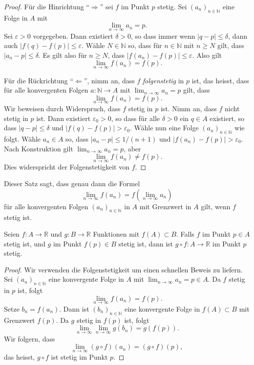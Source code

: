 \documentclass[../main.tex]{subfiles}
\begin{document}
\begin{proof}
  Für die Hinrichtung ``$\Rightarrow$'' sei $f$
  im Punkt $p$ stetig. Sei ${(a_{n})}_{n \in \mathbb{N}}$ 
  eine Folge in $A$ mit
  \[
    \lim_{n \to \infty} a_n = p.
  \]
  Sei $\varepsilon > 0$ vorgegeben.
  Dann existiert $\delta > 0$, so dass immer wenn
  $|q - p| \leq \delta$, dann auch
  $|f(q) - f(p)| \leq \varepsilon$.
  Wähle $N \in \mathbb{N}$ so,
  dass für $n \in \mathbb{N}$ mit $n \geq N$ gilt,
  dass $|a_n - p| \leq \delta$.
  Es gilt also für $n \geq N$, dass
  $|f(a_n) - f(p)| \leq \varepsilon$.
  Also gilt
  \[
    \lim_{n \to \infty} f(a_n) = f(p).
  \]
  
  Für die Rückrichtung ``$\Leftarrow$'', nimm an,
  dass $f$ \emph{folgenstetig} in $p$ ist,
  das heisst, dass für alle
  konvergenten Folgen $a \colon \mathbb{N} \to A$
  mit $\lim_{n \to \infty} a_n = p$ gilt,
  dass
  \[
    \lim_{n \to \infty} f(a_n) = f(p).
  \]
  Wir beweisen durch Widerspruch, dass
  $f$ stetig in $p$ ist.
  Nimm an, dass $f$ nicht stetig in $p$ ist.
  Dann existiert $\varepsilon_0 > 0$, so dass
  für alle $\delta > 0$ ein $q \in A$ 
  existiert, so dass
  $|q - p| \leq \delta$ und $|f(q) - f(p)| > \varepsilon_0$.
  Wähle nun eine Folge
  ${(a_{n})}_{n \in \mathbb{N}}$ wie folgt.
  Wähle $a_n \in A$ so, dass
  $|a_n - p| \leq 1/(n+1)$ und $|f(a_n) - f(p)| > \varepsilon_0$.
  Nach Konstruktion gilt
  $\lim_{n \to \infty} a_n = p$, aber
  \[
    \lim_{n \to \infty} f(a_n) \neq f(p).
  \]
  Dies widerspricht der Folgenstetigkeit von $f$.
\end{proof}

Dieser Satz sagt, dass genau dann die Formel
\[
  \lim_{n \to \infty}  f(a_n) = f\left(\lim_{n \to \infty} a_n\right)
\]
für alle konvergenten Folgen ${(a_{n})}_{n \in \mathbb{N}}$ in $A$
mit Grenzwert in $A$
gilt, wenn $f$ stetig ist.

\begin{application}
  Seien $f \colon A \to \mathbb{R}$ und $g \colon B \to \mathbb{R}$
  Funktionen mit $f(A) \subset B$. Falls $f$ im Punkt $p \in A$ 
  stetig ist, und $g$ im Punkt $f(p) \in B$ stetig ist,
  dann ist $g \circ f\colon A \to \mathbb{R}$ im Punkt $p$ stetig.
\end{application}

\begin{proof}
  Wir verwenden die Folgenstetigkeit um einen schnellen
  Beweis zu liefern.
  Sei  ${(a_{n})}_{n \in \mathbb{N}}$ eine konvergente
  Folge in $A$ mit $\lim_{n \to \infty} a_n = p \in A$.
  Da $f$ stetig in $p$ ist, folgt
  \[
    \lim_{n \to \infty}f(a_n) = f(p).
  \]
  Setze $b_n = f(a_n)$. Dann ist ${(b_{n})}_{n \in \mathbb{N}}$ 
  eine konvergente Folge in $f(A) \subset B$ mit Grenzwert
  $f(p)$.
  Da $g$ stetig in $f(p)$ ist, folgt
  \[
    \lim_{n \to \infty} \lim_{n \to \infty} g(b_n) = g(f(p)).
  \]
  Wir folgern, dass
  \[
    \lim_{n \to \infty} (g \circ f)(a_n) = (g \circ f)(p),
  \]
  das heisst, $g \circ f$ ist stetig im Punkt $p$.
\end{proof}
\end{document}
